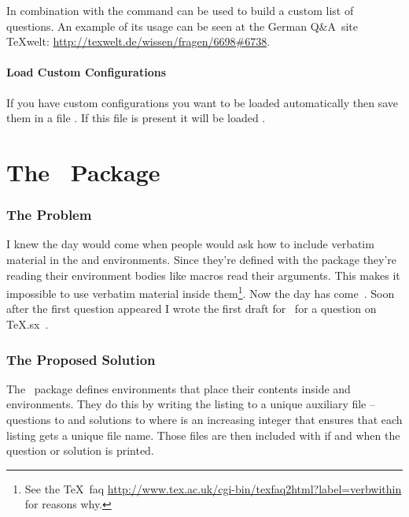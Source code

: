\documentclass[load-preamble+]{cnltx-doc}
\begin{document}
In combination with  the command can be used to build a
custom list of questions.  An example of its usage can be seen at the German
Q\&A~site \TeX welt: \url{http://texwelt.de/wissen/fragen/6698#6738}.

\subsection{Load Custom Configurations}
If you have custom configurations you want to be loaded automatically then save
them in a file . If this file is present it
will be loaded .


\part{The \ExSheetslistings\ Package}\label{part:listings}
\section{The Problem}
I knew the day would come when people would ask how to include verbatim
material in the  and  environments.  Since they're
defined with the  package they're reading their environment
bodies like macros read their arguments.  This makes it impossible to use
verbatim material inside them\footnote{See the \TeX\ \acs{faq}
  \url{http://www.tex.ac.uk/cgi-bin/texfaq2html?label=verbwithin} for reasons
  why.}.  Now the day has come~\cite{tex.sx:131546}.  Soon after the first
question appeared I wrote the first draft for \ExSheetslistings\ for a question
on \TeX.sx~\cite{tex.sx:133907}.

\section{The Proposed Solution}

The \ExSheetslistings\ package defines  environments that place
their contents inside  and  environments.  They do
this by writing the listing to a unique auxiliary file --
questions to  and solutions to
 where  is an increasing
integer that ensures that each listing gets a unique file name.  Those files
are then included with  if and when the question or
solution is printed.
\end{document}
